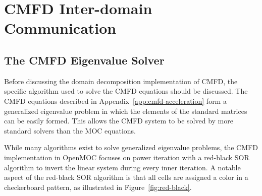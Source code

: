 \newpage
\section{CMFD Inter-domain Communication}
\label{sec:cmfd-dd}

\subsection{The CMFD Eigenvalue Solver}

Before discussing the domain decomposition implementation of \ac{CMFD}, the specific algorithm used to solve the \ac{CMFD} equations should be discussed. The \ac{CMFD} equations described in Appendix~\ref{app:cmfd-acceleration} form a generalized eigenvalue problem in which the elements of the standard matrices can be easily formed. This allows the \ac{CMFD} system to be solved by more standard solvers than the \ac{MOC} equations.

While many algorithms exist to solve generalized eigenvalue problems, the \ac{CMFD} implementation in OpenMOC focuses on power iteration with a red-black SOR algorithm to invert the linear system during every inner iteration. A notable aspect of the red-black SOR algorithm is that all cells are assigned a color in a checkerboard pattern, as illustrated in Figure~\ref{fig:red-black}. 

